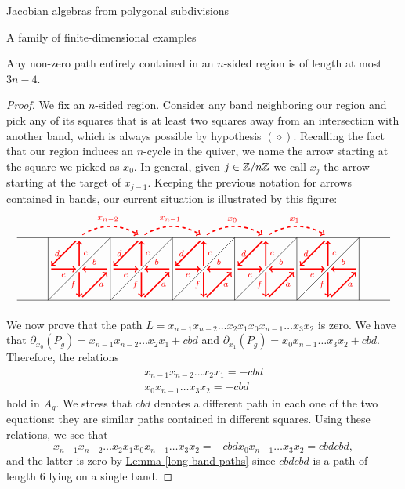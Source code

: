 \begin{chapter}{Jacobian algebras from polygonal subdivisions}
\begin{section}{A family of finite-dimensional examples}
\begin{lemma}\label{long-region-paths} Any non-zero path entirely contained in an $n$-sided region is of length at most $3n-4$.
\end{lemma}
\begin{proof} We fix an $n$-sided region. Consider any band neighboring our region and pick any of its squares that is at least two squares away from an intersection with another band, which is always possible by hypothesis \hyperref[diamondhyp]{$(\diamond)$}. Recalling the fact that our region induces an $n$-cycle in the quiver, we name the arrow starting at the square we picked as $x_0$. In general, given $j\in \mathbb{Z}/n\mathbb{Z}$ we call $x_j$ the arrow starting at the target of $x_{j-1}$. Keeping the previous notation for arrows contained in bands, our current situation is illustrated by this figure:
\[
\begin{tikzpicture}[text width=1.5mm, font=\footnotesize]
\draw (-6, 0) -- (6, 0);
\draw (-6, 2) -- (6, 2);
\foreach \x in {-5,-3,...,5}
\draw (\x, 0) -- (\x, 2);
\foreach \x in {-5,-3,...,3}
{
\draw (\x,0) -- (\x+2, 2);
\draw [->, red, very thick] (\x+1.9, 1) to node[above] {$b$} (\x+1.1, 1);
\draw[->, red, very thick] (\x+1, 0.9) to node[left]{$f$} (\x+1, 0.1);
\draw[->, red, very thick] (\x+1.1, 0.1) to node[right]{$a$} (\x+1.9, 0.9);
\draw[->, red, very thick] (\x+1, 1.1) to node[right]{$c$} (\x+1, 1.9);
\draw[->, red, very thick] (\x+0.9, 1.9) to node[left]{$d$} (\x+0.1, 1.1);
\draw[->, red, very thick] (\x+0.1, 1) to node[below]{$e$} (\x+0.9, 1);
}

\draw[->, red, dashed, very thick] (-5+1.1, 2.1) to [bend left] node[above]{$\mathclap{x_{n-2}}$} (-5+2.9, 2.1);
\draw[->, red, dashed, very thick] (-3+1.1, 2.1) to [bend left] node[above]{$\mathclap{x_{n-1}}$} (-3+2.9, 2.1);
\draw[->, red, dashed, very thick] (-1+1.1, 2.1) to [bend left] node[above]{$\mathclap{x_{0}}$} (-1+2.9, 2.1);
\draw[->, red, dashed, very thick] (1+1.1, 2.1) to [bend left] node[above]{$\mathclap{x_{1}}$} (1+2.9, 2.1);
\end{tikzpicture}
\]

We now prove that the path $L=x_{n-1}x_{n-2}\dots x_2x_1x_{0}x_{n-1}\dots x_3x_2$ is zero. We have that $\partial_{x_0}(P_g)=x_{n-1}x_{n-2}\dots x_2x_1+cbd$ and $\partial_{x_1}(P_g)=x_{0}x_{n-1}\dots x_3x_2+cbd$. Therefore, the relations
\begin{align*}
x_{n-1}x_{n-2}\dots x_2x_1=-cbd\\
x_{0}x_{n-1}\dots x_3x_2=-cbd
\end{align*}
hold in $A_g$. We stress that $cbd$ denotes a different path in each one of the two equations: they are similar paths contained in different squares. Using these relations, we see that $$x_{n-1}x_{n-2}\dots x_2x_1x_{0}x_{n-1}\dots x_3x_2=-cbdx_{0}x_{n-1}\dots x_3x_2=cbdcbd,$$ and the latter is zero by \hyperref[long-band-paths]{Lemma \ref*{long-band-paths}} since $cbdcbd$ is a path of length 6 lying on a single band. 


\end{proof}
\end{section}
\end{chapter}
